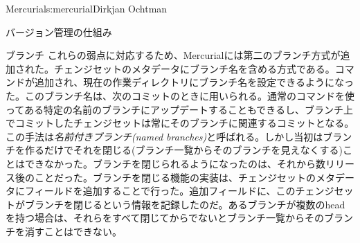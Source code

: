 \begin{aosachapter}{Mercurial}{s:mercurial}{Dirkjan Ochtman}
\begin{aosasect1}{バージョン管理の仕組み}
\begin{aosasect2}{ブランチ}
これらの弱点に対応するため、Mercurialには第二のブランチ方式が追加された。チェンジセットのメタデータにブランチ名を含める方式である。コマンドが追加され、現在の作業ディレクトリにブランチ名を設定できるようになった。このブランチ名は、次のコミットのときに用いられる。通常のコマンドを使ってある特定の名前のブランチにアップデートすることもできるし、ブランチ上でコミットしたチェンジセットは常にそのブランチに関連するコミットとなる。この手法は\emph{名前付きブランチ(named branches)}と呼ばれる。しかし当初はブランチを作るだけでそれを閉じる(ブランチ一覧からそのブランチを見えなくする)ことはできなかった。ブランチを閉じられるようになったのは、それから数リリース後のことだった。ブランチを閉じる機能の実装は、チェンジセットのメタデータにフィールドを追加することで行った。追加フィールドに、このチェンジセットがブランチを閉じるという情報を記録したのだ。あるブランチが複数のheadを持つ場合は、それらをすべて閉じてからでないとブランチ一覧からそのブランチを消すことはできない。


\end{aosasect2}
\end{aosasect1}
\end{aosachapter}
